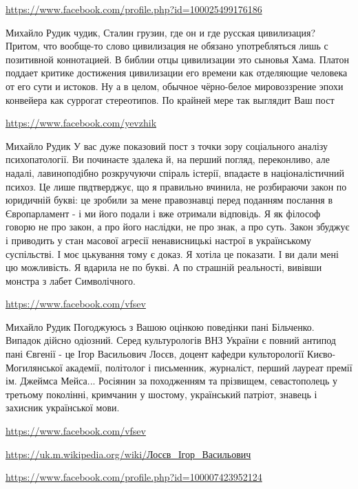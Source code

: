 \documentclass[a4paper,11pt]{extreport}
\begin{document}
\begin{itemize}
\begin{itemize}
\url{https://www.facebook.com/profile.php?id=100025499176186}

Михайло Рудик чудик, Сталин грузин, где он и где русская цивилизация?
Притом, что вообще-то слово цивилизация не обязано употребляться лишь с позитивной коннотацией.
В библии отцы цивилизации это сыновья Хама.
Платон поддает критике достижения цивилизации его времени как отделяющие человека от его сути и истоков.
Ну а в целом, обычное чёрно-белое мировоззрение эпохи конвейера как суррогат стереотипов. По крайней мере так выглядит Ваш пост

\url{https://www.facebook.com/yevzhik}

Михайло Рудик У вас дуже показовий пост з точки зору соціального аналізу психопатології. Ви починаєте здалека й, на перший погляд, переконливо, але надалі, лавиноподібно розкручуючи спіраль істерії, впадаєте в націоналістичний психоз. Це лише пвдтверджує, що я правильно вчинила, не розбираючи закон по юридичній букві: це зробили за мене правознавці перед поданням послання в Європарламент - і ми його подали і вже отримали відповідь. Я як філософ говорю не про закон, а про його наслідки, не про знак, а про суть. Закон збуджує і приводить у стан масової агресії ненависницькі настрої в українському суспільстві. І моє цькування тому є доказ. Я хотіла це показати. І ви дали мені цю можливість. Я вдарила не по букві. А по страшній реальності, вивівши монстра з лабет Символічного.

\url{https://www.facebook.com/vfsev}

Михайло Рудик Погоджуюсь з Вашою оцінкою поведінки пані Більченко. Випадок дійсно одіозний. Серед культурологів ВНЗ України є повний антипод пані Євгенії - це Ігор Васильович Лосєв, доцент кафедри культорології Києво-Могилянської академії, політолог і письменник, журналіст, перший лауреат премії ім. Джеймса Мейса... Росіянин за походженням та прізвищем, севастополець у третьому поколінні, кримчанин у шостому, український патріот, знавець і захисник української мови.

\url{https://www.facebook.com/vfsev}

\url{https://uk.m.wikipedia.org/wiki/Лосєв_Ігор_Васильович}

\end{itemize}
\url{https://www.facebook.com/profile.php?id=100007423952124}


\end{itemize}
\end{document}
